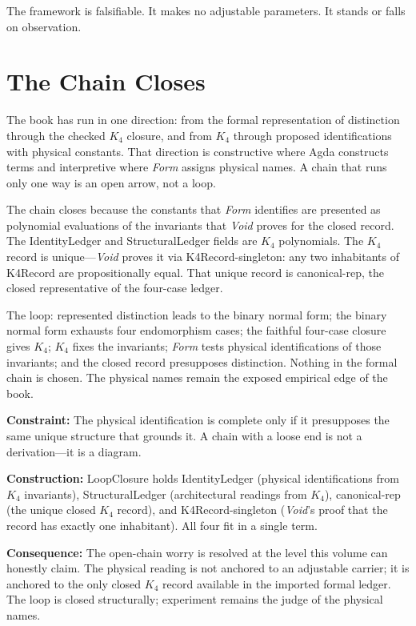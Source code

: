 \documentclass[11pt,a4paper]{book}
\def\texttt#1{#1}%
\begin{document}
The framework is falsifiable. It makes no adjustable parameters. It stands or falls on observation.

\section*{The Chain Closes}

The book has run in one direction: from the formal representation of distinction through the checked $K_4$ closure, and from $K_4$ through proposed identifications with physical constants. That direction is constructive where Agda constructs terms and interpretive where \textit{Form} assigns physical names. A chain that runs only one way is an open arrow, not a loop.

The chain closes because the constants that \textit{Form} identifies are presented as polynomial evaluations of the invariants that \textit{Void} proves for the closed record. The \texttt{IdentityLedger} and \texttt{StructuralLedger} fields are $K_4$ polynomials. The $K_4$ record is unique---\textit{Void} proves it via \texttt{K4Record-singleton}: any two inhabitants of \texttt{K4Record} are propositionally equal. That unique record is \texttt{canonical-rep}, the closed representative of the four-case ledger.

The loop: represented distinction leads to the binary normal form; the binary normal form exhausts four endomorphism cases; the faithful four-case closure gives $K_4$; $K_4$ fixes the invariants; \textit{Form} tests physical identifications of those invariants; and the closed record presupposes distinction. Nothing in the formal chain is chosen. The physical names remain the exposed empirical edge of the book.

\textbf{Constraint:} The physical identification is complete only if it presupposes the same unique structure that grounds it. A chain with a loose end is not a derivation---it is a diagram.

\textbf{Construction:} \texttt{LoopClosure} holds \texttt{IdentityLedger} (physical identifications from $K_4$ invariants), \texttt{StructuralLedger} (architectural readings from $K_4$), \texttt{canonical-rep} (the unique closed $K_4$ record), and \texttt{K4Record-singleton} (\textit{Void}'s proof that the record has exactly one inhabitant). All four fit in a single term.

\textbf{Consequence:} The open-chain worry is resolved at the level this volume can honestly claim. The physical reading is not anchored to an adjustable carrier; it is anchored to the only closed $K_4$ record available in the imported formal ledger. The loop is closed structurally; experiment remains the judge of the physical names.
\end{document}
